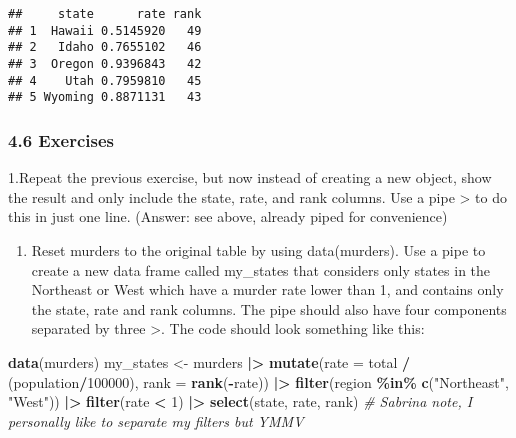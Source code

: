 \documentclass[
]{article}
\newenvironment{Shaded}{\begin{snugshade}}{\end{snugshade}}
\newcommand{\AttributeTok}[1]{\textcolor[rgb]{0.13,0.29,0.53}{#1}}
\newcommand{\CommentTok}[1]{\textcolor[rgb]{0.56,0.35,0.01}{\textit{#1}}}
\newcommand{\DecValTok}[1]{\textcolor[rgb]{0.00,0.00,0.81}{#1}}
\newcommand{\FunctionTok}[1]{\textcolor[rgb]{0.13,0.29,0.53}{\textbf{#1}}}
\newcommand{\NormalTok}[1]{#1}
\newcommand{\OtherTok}[1]{\textcolor[rgb]{0.56,0.35,0.01}{#1}}
\newcommand{\SpecialCharTok}[1]{\textcolor[rgb]{0.81,0.36,0.00}{\textbf{#1}}}
\newcommand{\StringTok}[1]{\textcolor[rgb]{0.31,0.60,0.02}{#1}}
\providecommand{\tightlist}{%
  \setlength{\itemsep}{0pt}\setlength{\parskip}{0pt}}
\begin{document}
\begin{verbatim}
##     state      rate rank
## 1  Hawaii 0.5145920   49
## 2   Idaho 0.7655102   46
## 3  Oregon 0.9396843   42
## 4    Utah 0.7959810   45
## 5 Wyoming 0.8871131   43
\end{verbatim}

\hypertarget{exercises-2}{%
\subsubsection{4.6 Exercises}\label{exercises-2}}

1.Repeat the previous exercise, but now instead of creating a new
object, show the result and only include the state, rate, and rank
columns. Use a pipe \textbar\textgreater{} to do this in just one line.
(Answer: see above, already piped for convenience)

\begin{enumerate}
\def\labelenumi{\arabic{enumi}.}
\setcounter{enumi}{1}
\tightlist
\item
  Reset murders to the original table by using data(murders). Use a pipe
  to create a new data frame called my\_states that considers only
  states in the Northeast or West which have a murder rate lower than 1,
  and contains only the state, rate and rank columns. The pipe should
  also have four components separated by three \textbar\textgreater. The
  code should look something like this:
\end{enumerate}

\begin{Shaded}
\begin{Highlighting}[]
\FunctionTok{data}\NormalTok{(murders)}
\NormalTok{my\_states }\OtherTok{\textless{}{-}}\NormalTok{ murders }\SpecialCharTok{|\textgreater{}} 
  \FunctionTok{mutate}\NormalTok{(}\AttributeTok{rate =}\NormalTok{ total }\SpecialCharTok{/}\NormalTok{ (population}\SpecialCharTok{/}\DecValTok{100000}\NormalTok{),}
         \AttributeTok{rank =} \FunctionTok{rank}\NormalTok{(}\SpecialCharTok{{-}}\NormalTok{rate)) }\SpecialCharTok{|\textgreater{}} 
  \FunctionTok{filter}\NormalTok{(region }\SpecialCharTok{\%in\%} \FunctionTok{c}\NormalTok{(}\StringTok{"Northeast"}\NormalTok{, }\StringTok{"West"}\NormalTok{)) }\SpecialCharTok{|\textgreater{}} 
  \FunctionTok{filter}\NormalTok{(rate }\SpecialCharTok{\textless{}} \DecValTok{1}\NormalTok{) }\SpecialCharTok{|\textgreater{}} 
  \FunctionTok{select}\NormalTok{(state, rate, rank)}
\CommentTok{\# Sabrina note, I personally like to separate my filters but YMMV}
\end{Highlighting}
\end{Shaded}
\end{document}
